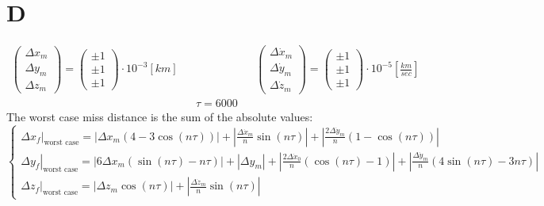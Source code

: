 \documentclass[11pt, a4paper]{article}
\begin{document}
\section{D}
\begin{equation*}
    \begin{matrix}
        \left(\begin{array}{c}
            \Delta x_m \\ \Delta y_m \\ \Delta z_m
        \end{array}\right) = \left(\begin{array}{c}
            \pm 1 \\
            \pm 1 \\
            \pm 1
        \end{array}\right)\cdot10^{-3}\left[km\right] &&&& \left(\begin{array}{c}
            \Delta \dot{x}_m \\ \Delta \dot{y}_m \\ \Delta \dot{z}_m
        \end{array}\right) = \left(\begin{array}{c}
            \pm 1 \\
            \pm 1 \\
            \pm 1
        \end{array}\right)\displaystyle\cdot10^{-5}\left[\frac{km}{sec}\right] \\
        &&\tau = 6000&& 
    \end{matrix}
\end{equation*}
The worst case miss distance is the sum of the absolute values:
\begin{equation}
    \left\{\begin{array}{l}
        \displaystyle\left.\Delta x_f\right|_\text{worst case} = \left|\Delta x_m\left(4-3\cos(n\tau)\right)\right| + \left|\frac{\Delta\dot{x}_m}{n}\sin(n\tau)\right| + \left|\frac{2\Delta\dot{y}_m}{n}\left(1-\cos(n\tau)\right)\right| \\
        \displaystyle\left.\Delta y_f\right|_\text{worst case} = \left|6\Delta x_m\left(\sin(n\tau)-n\tau\right)\right| + \left|\Delta y_m\right| + \left|\frac{2\Delta\dot{x}_0}{n}\left(\cos(n\tau)-1\right)\right| + \left|\frac{\Delta\dot{y}_m}{n}\left(4\sin(n\tau)-3n\tau\right)\right| \\
        \displaystyle\left.\Delta z_f\right|_\text{worst case} = \left|\Delta z_m\cos(n\tau)\right| + \left|\frac{\Delta\dot{z}_m}{n}\sin(n\tau)\right|
    \end{array}\right.
\end{equation}
\end{document}
